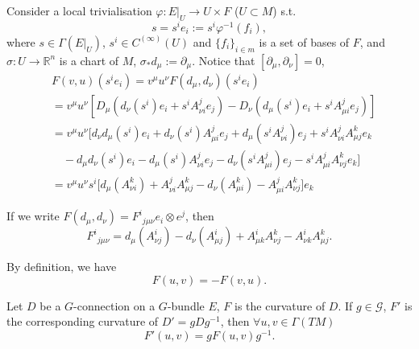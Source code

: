 \documentclass[openany, oneside, a5paper]{book}
\begin{document}
Consider a local trivialisation $\varphi \colon E|_U \to U \times F$ ($U \subset M$) s.t.\ 
\begin{equation}
    s = s^i e_i := s^i\varphi^{-1}(f_i),
\end{equation}
where $s \in \Gamma(E|_U)$, $s^i \in C^{(\infty)}(U)$ and $\{f_i\}_{i \in m}$ is a set of bases of $F$,
and $\sigma \colon U \to \mathbb R^n$ is a chart of $M$, $\sigma_* d_\mu := \partial_\mu$.
Notice that $[\partial_\mu, \partial_\nu] = 0$,
\begin{equation}
    \begin{aligned}
        &F(v, u) (s^i e_i) 
        = v^\mu u^\nu F(d_\mu, d_\nu) (s^i e_i)
        \\
        &= v^\mu u^\nu [
            D_\mu (d_\nu(s^i)e_i + s^i A_{\nu i}^j e_j)
            - D_\nu (d_\mu(s^i)e_i + s^i A_{\mu i}^j e_j)
        ]
        \\
        &= v^\mu u^\nu \big[
            d_\nu d_\mu (s^i) e_i + d_\nu (s^i) A_{\mu i}^j e_j
            + d_\mu(s^i A_{\nu i}^j) e_j + s^i A_{\nu i}^j A_{\mu j}^k e_k
        \\
        &\quad
        - d_\mu d_\nu(s^i) e_i - d_\mu(s^i) A_{\nu i}^j e_j
        - d_\nu(s^i A_{\mu i}^j) e_j - s^i A_{\mu i}^j A_{\nu j}^k e_k
        \big]
        \\
        &= v^\mu u^\nu s^i\big[ 
            d_\mu (A_{\nu i}^k) + A_{\nu i}^j A_{\mu j}^k
            - d_\nu (A_{\mu i}^k) - A_{\mu i}^j A_{\nu j}^k 
        \big] e_k
    \end{aligned}
\end{equation}

If we write $F(d_\mu, d_\nu) = {F^i}_{j\mu\nu} e_i \otimes e^j$,
then
\begin{equation}
    {F^i}_{j\mu\nu} = d_\mu (A_{\nu j}^i) - d_\nu (A_{\mu j}^i) + A_{\mu k}^i A_{\nu j}^k - A_{\nu k}^i A_{\mu j}^k.
\end{equation}

By definition, we have
\begin{equation}
    F(u, v) = - F(v, u).
\end{equation}

\begin{theorem}
    Let $D$ be a $G$-connection on a $G$-bundle $E$, $F$ is the curvature of $D$.
    If $g \in \mathcal G$, $F'$ is the corresponding curvature of $D' = g D g^{-1}$, 
    then $\forall u, v \in \Gamma(TM)$
    \begin{equation}
        F'(u, v) = g F(u, v) g^{-1}.
    \end{equation}
\end{theorem}
\end{document}
